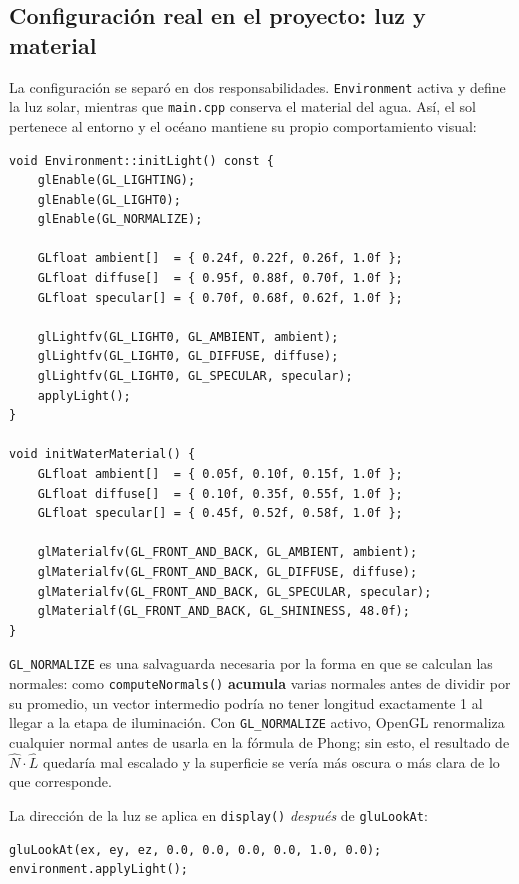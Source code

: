 ﻿\documentclass[11pt]{article}
\begin{document}
\subsection{Configuración real en el proyecto: luz y material}

La configuración se separó en dos responsabilidades. \texttt{Environment}
activa y define la luz solar, mientras que \texttt{main.cpp} conserva el
material del agua. Así, el sol pertenece al entorno y el océano mantiene su
propio comportamiento visual:

\begin{lstlisting}
void Environment::initLight() const {
    glEnable(GL_LIGHTING);
    glEnable(GL_LIGHT0);
    glEnable(GL_NORMALIZE);

    GLfloat ambient[]  = { 0.24f, 0.22f, 0.26f, 1.0f };
    GLfloat diffuse[]  = { 0.95f, 0.88f, 0.70f, 1.0f };
    GLfloat specular[] = { 0.70f, 0.68f, 0.62f, 1.0f };

    glLightfv(GL_LIGHT0, GL_AMBIENT, ambient);
    glLightfv(GL_LIGHT0, GL_DIFFUSE, diffuse);
    glLightfv(GL_LIGHT0, GL_SPECULAR, specular);
    applyLight();
}

void initWaterMaterial() {
    GLfloat ambient[]  = { 0.05f, 0.10f, 0.15f, 1.0f };
    GLfloat diffuse[]  = { 0.10f, 0.35f, 0.55f, 1.0f };
    GLfloat specular[] = { 0.45f, 0.52f, 0.58f, 1.0f };

    glMaterialfv(GL_FRONT_AND_BACK, GL_AMBIENT, ambient);
    glMaterialfv(GL_FRONT_AND_BACK, GL_DIFFUSE, diffuse);
    glMaterialfv(GL_FRONT_AND_BACK, GL_SPECULAR, specular);
    glMaterialf(GL_FRONT_AND_BACK, GL_SHININESS, 48.0f);
}
\end{lstlisting}

\texttt{GL\_NORMALIZE} es una salvaguarda necesaria por la forma en que se
calculan las normales: como \texttt{computeNormals()} \textbf{acumula} varias
normales antes de dividir por su promedio, un vector intermedio podría no
tener longitud exactamente 1 al llegar a la etapa de iluminación. Con
\texttt{GL\_NORMALIZE} activo, OpenGL renormaliza cualquier normal antes de
usarla en la fórmula de Phong; sin esto, el resultado de $\hat N \cdot \hat L$
quedaría mal escalado y la superficie se vería más oscura o más clara de lo
que corresponde.

La dirección de la luz se aplica en \texttt{display()} \emph{después} de
\texttt{gluLookAt}:

\begin{lstlisting}
gluLookAt(ex, ey, ez, 0.0, 0.0, 0.0, 0.0, 1.0, 0.0);
environment.applyLight();
\end{lstlisting}
\end{document}
